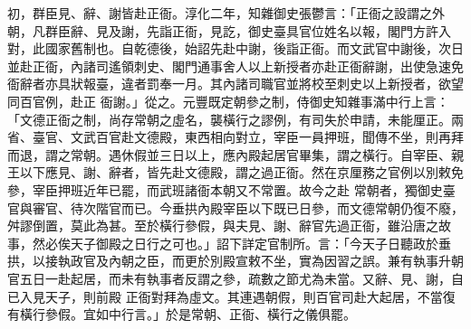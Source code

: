 \begin{pinyinscope}
 初，群臣見、辭、謝皆赴正衙。淳化二年，知雜御史張鬱言：「正衙之設謂之外朝，凡群臣辭、見及謝，先詣正衙，見訖，御史臺具官位姓名以報，閣門方許入對，此國家舊制也。自乾德後，始詔先赴中謝，後詣正衙。而文武官中謝後，次日並赴正衙，內諸司遙領刺史、閣門通事舍人以上新授者亦赴正衙辭謝，出使急速免衙辭者亦具狀報臺，違者罰奉一月。其內諸司職官並將校至刺史以上新授者，欲望同百官例，赴正
 衙謝。」從之。元豐既定朝參之制，侍御史知雜事滿中行上言：「文德正衙之制，尚存常朝之虛名，襲橫行之謬例，有司失於申請，未能厘正。兩省、臺官、文武百官赴文德殿，東西相向對立，宰臣一員押班，聞傳不坐，則再拜而退，謂之常朝。遇休假並三日以上，應內殿起居官畢集，謂之橫行。自宰臣、親王以下應見、謝、辭者，皆先赴文德殿，謂之過正衙。然在京厘務之官例以別敕免參，宰臣押班近年已罷，而武班諸衙本朝又不常置。故今之赴
 常朝者，獨御史臺官與審官、待次階官而已。今垂拱內殿宰臣以下既已日參，而文德常朝仍復不廢，舛謬倒置，莫此為甚。至於橫行參假，與夫見、謝、辭官先過正衙，雖沿唐之故事，然必俟天子御殿之日行之可也。」詔下詳定官制所。言：「今天子日聽政於垂拱，以接執政官及內朝之臣，而更於別殿宣敕不坐，實為因習之誤。兼有執事升朝官五日一赴起居，而未有執事者反謂之參，疏數之節尤為未當。又辭、見、謝，自已入見天子，則前殿
 正衙對拜為虛文。其連遇朝假，則百官司赴大起居，不當復有橫行參假。宜如中行言。」於是常朝、正衙、橫行之儀俱罷。



\end{pinyinscope}